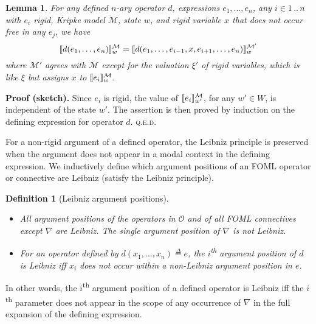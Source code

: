 \documentclass{easychair}
\renewcommand{\qed}{\hspace*{\fill}\textsc{q.e.d.}}
\renewcommand{\th}{\textsuperscript{th}\xspace}
\newcommand{\sem}[1]{\ensuremath{[\![ #1 ]\!]}}
\newcommand{\modal}{\nabla}
\newcommand{\MM}{\mathcal{M}}
\newcommand{\OO}{\mathcal{O}}
\newtheorem{lemma}[theorem]{Lemma}
\newtheorem{definition}[theorem]{Definition}
\newenvironment{proofsketch}{\par\noindent\textbf{Proof (sketch).}\quad}{\medskip\par\noindent}
\let\notla\relax
\newcommand{\deq}{\mathrel{\stackrel{\scriptscriptstyle\Delta}{=}}}
\begin{document}
\begin{lemma}\label{thm:rigid-leibniz}
  For any defined $n$-ary operator $d$, expressions $e_1, \ldots, e_n$, any $i
  \in 1\,..\,n$ with
  $e_i$ rigid, Kripke model $\MM$, state $w$, and
  rigid variable $x$ that does not occur free in any $e_j$, we have
%
  \[\notla
    \sem{d(e_1,\ldots,e_n)}^{\MM}_w =
    \sem{d(e_1,\ldots,e_{i-1},x,e_{i+1},\ldots,e_n)}^{\MM'}_w
  \]
%
  where $\MM'$ agrees with $\MM$ except for the valuation $\xi'$ of rigid
  variables, which is like $\xi$ but assigns $x$ to $\notla\sem{e_i}^{\MM}_w$.
\end{lemma}
\begin{proofsketch}
  Since $e_i$ is rigid, the value of
  $\notla\sem{e_i}^{\MM}_{w'}$, for any $w' \in W$, is independent of the state
  $w'$. The assertion is then proved by induction on the defining expression for
  operator $d$.
%
  \qed
\end{proofsketch}
%
For a non-rigid argument of a defined operator, the Leibniz principle is
preserved when the argument does not appear in a modal context in the defining
expression. We inductively define which argument positions of an FOML operator or
connective are Leibniz (satisfy the Leibniz principle).

\pagebreak %

\begin{definition}[Leibniz argument positions]\label{def:leibniz-pos}\mbox{}
  \begin{itemize}
  \item All argument positions of the operators in $\OO$ and of all FOML
    connectives except $\modal$ are Leibniz. The single argument position of $\modal$
    is not Leibniz.
  \item For an operator defined by $d(x_1,\ldots,x_n) \deq e$, the
    $i$\th argument position of $d$ is Leibniz iff
    $x_i$ does not occur within a non-Leibniz argument position in $e$.
  \end{itemize}
\end{definition}
%
In other words, the $i$\th argument position of a defined operator is Leibniz iff
the $i$\th parameter does not appear in the scope of any
occurrence of $\modal$
in the full expansion of the defining expression.
\end{document}
